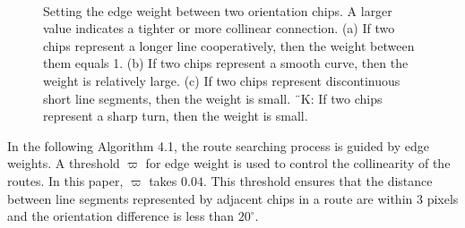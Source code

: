 \documentclass{article}
\begin{document}
\begin{figure}[!t]
\centering
{}
\hfil
{}\\
\hfil
{}
\caption{Setting the edge weight between two orientation chips. 
A larger value indicates a tighter or more collinear connection.
(a) If two chips represent a longer line cooperatively, then the weight between them equals 1.
(b) If two chips represent a smooth curve, then the weight is relatively large.
(c) If two chips represent discontinuous short line segments, then the weight is small.
¨K: If two chips represent a sharp turn, then the weight is small.}
\label{fig:10}
\end{figure}

In the following Algorithm 4.1, the route searching process is guided by edge weights.
A threshold $\varpi$ for edge weight is used to control the collinearity of the routes.
In this paper, $\varpi$ takes $0.04$.
This threshold ensures that the distance between line segments represented by adjacent chips in a route are within 3 pixels and the orientation difference is less than $20^\circ$.
\end{document}
